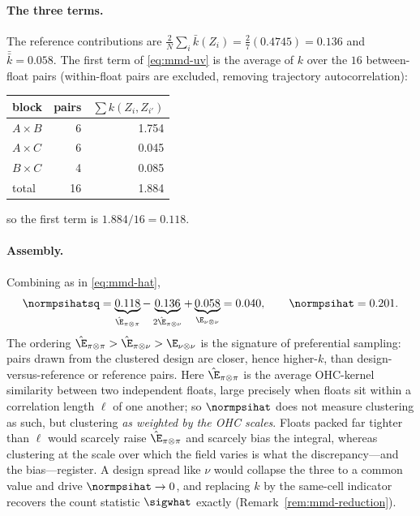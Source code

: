 \paragraph{The three terms.}
The reference contributions are $\tfrac{2}{N}\sum_i\bar k(Z_i)=\tfrac{2}{7}(0.4745)=0.136$
and $\bar{\bar k}=0.058$. The first term of \eqref{eq:mmd-uv} is the average of
$k$ over the $16$ between-float pairs (within-float pairs are excluded, removing
trajectory autocorrelation):

\begin{center}
\begin{tabular}{lrr}
\hline
block & pairs & $\sum k(Z_i,Z_{i'})$\\
\hline
$A\times B$ & 6 & 1.754\\
$A\times C$ & 6 & 0.045\\
$B\times C$ & 4 & 0.085\\
\hline
total & 16 & 1.884\\
\hline
\end{tabular}
\end{center}

so the first term is $1.884/16=0.118$.

\paragraph{Assembly.}
Combining as in \eqref{eq:mmd-hat},
\[
  \normpsihatsq
  =\underbrace{0.118}_{\hat\E_{\pi\otimes\pi}}
  -\underbrace{0.136}_{2\hat\E_{\pi\otimes\nu}}
  +\underbrace{0.058}_{\E_{\nu\otimes\nu}}
  =0.040,
  \qquad
  \normpsihat=0.201 .
\]
The ordering $\hat\E_{\pi\otimes\pi}>\hat\E_{\pi\otimes\nu}>\E_{\nu\otimes\nu}$ is
the signature of preferential sampling: pairs drawn from the clustered design are
closer, hence higher-$k$, than design-versus-reference or reference pairs. Here
$\hat\E_{\pi\otimes\pi}$ is the average OHC-kernel similarity between two
independent floats, large precisely when floats sit within a correlation length
$\ell$ of one another; so $\normpsihat$ does not measure clustering as such, but
clustering \emph{as weighted by the OHC scales}. Floats packed far tighter than
$\ell$ would scarcely raise $\hat\E_{\pi\otimes\pi}$ and scarcely bias the
integral, whereas clustering at the scale over which the field varies is what the
discrepancy---and the bias---register. A
design spread like $\nu$ would collapse the three to a common value and drive
$\normpsihat\to0$, and replacing $k$ by the same-cell indicator recovers the
count statistic $\sigwhat$ exactly (Remark~\ref{rem:mmd-reduction}).

